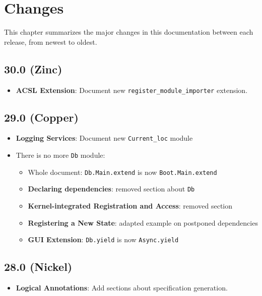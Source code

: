 
\chapter{Changes}\label{chap:changes}

This chapter summarizes the major changes in this documentation between each
\framac release, from newest to oldest.


\section*{30.0 (Zinc)}
\begin{itemize}
  \item \textbf{ACSL Extension}:
    Document new \verb+register_module_importer+ extension.
\end{itemize}


\section*{29.0 (Copper)}
\begin{itemize}
\item \textbf{Logging Services}: Document new \texttt{Current\_loc} module
\item There is no more \texttt{Db} module:
  \begin{itemize}
  \item Whole document: \texttt{Db.Main.extend} is now \texttt{Boot.Main.extend}
  \item \textbf{Declaring dependencies}: removed section about \texttt{Db}
  \item \textbf{Kernel-integrated Registration and Access}: removed section
  \item \textbf{Registering a New State}: adapted example on postponed dependencies
  \item \textbf{GUI Extension}: \texttt{Db.yield} is now \texttt{Async.yield}
  \end{itemize}
\end{itemize}

\section*{28.0 (Nickel)}
\begin{itemize}
\item \textbf{Logical Annotations}: Add sections about specification generation.
\end{itemize}

